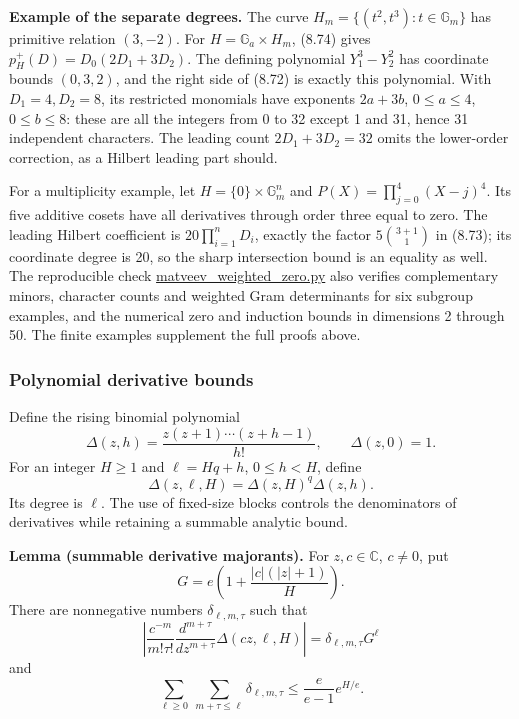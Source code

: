 \documentclass[
  11pt,
  a4paper,
]{article}
\begin{document}
\textbf{Example of the separate degrees.} The curve
\(H_m=\{(t^2,t^3):t\in\mathbb G_m\}\) has primitive relation \((3,-2)\).
For \(H=\mathbb G_a\times H_m\), (8.74) gives
\(p_H^+(D)=D_0(2D_1+3D_2)\). The defining polynomial \(Y_1^3-Y_2^2\) has
coordinate bounds \((0,3,2)\), and the right side of (8.72) is exactly
this polynomial. With \(D_1=4,D_2=8\), its restricted monomials have
exponents \(2a+3b\), \(0\le a\le4\), \(0\le b\le8\): these are all the
integers from 0 to 32 except 1 and 31, hence 31 independent characters.
The leading count \(2D_1+3D_2=32\) omits the lower-order correction, as
a Hilbert leading part should.

For a multiplicity example, let \(H=\{0\}\times\mathbb G_m^n\) and
\(P(X)=\prod_{j=0}^{4}(X-j)^4\). Its five additive cosets have all
derivatives through order three equal to zero. The leading Hilbert
coefficient is \(20\prod_{i=1}^nD_i\), exactly the factor
\(5\binom{3+1}{1}\) in (8.73); its coordinate degree is 20, so the sharp
intersection bound is an equality as well. The reproducible check
\href{https://kokunoyumeto.github.io/open-math-courses-public/courses/TR-BAKER/verification/matveev_weighted_zero.py}{matveev\_weighted\_zero.py}
also verifies complementary minors, character counts and weighted Gram
determinants for six subgroup examples, and the numerical zero and
induction bounds in dimensions 2 through 50. The finite examples
supplement the full proofs above.

\subsubsection{Polynomial derivative
bounds}\label{polynomial-derivative-bounds}

Define the rising binomial polynomial \[
\Delta(z,h)=\frac{z(z+1)\cdots(z+h-1)}{h!},\qquad \Delta(z,0)=1.
\] For an integer \(H\ge1\) and \(\ell=Hq+h\), \(0\le h<H\), define \[
\Delta(z,\ell,H)=\Delta(z,H)^q\Delta(z,h).
\] Its degree is \(\ell\). The use of fixed-size blocks controls the
denominators of derivatives while retaining a summable analytic bound.

\textbf{Lemma (summable derivative majorants).} For \(z,c\in\mathbb C\),
\(c\ne0\), put \[
G=e\left(1+\frac{|c|(|z|+1)}H\right).
\] There are nonnegative numbers \(\delta_{\ell,m,\tau}\) such that \[
\left|\frac{c^{-m}}{m!\tau!}
\frac{d^{m+\tau}}{dz^{m+\tau}}\Delta(cz,\ell,H)\right|
=\delta_{\ell,m,\tau}G^\ell
\] and \[
\sum_{\ell\ge0}\ \sum_{m+\tau\le\ell}\delta_{\ell,m,\tau}
\le\frac e{e-1}e^{H/e}. \tag{8.84}
\]
\end{document}
